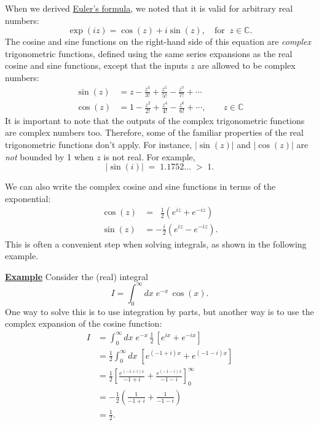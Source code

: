 \documentclass[10pt,a4paper]{article}
\begin{document}
When we derived \protect\hyperlink{euler_formula}{Euler's formula}, we
noted that it is valid for arbitrary real numbers:
\begin{equation}
  \exp(iz) = \cos(z) + i \sin(z), \quad \mathrm{for}\;\;z\in\mathbb{C}.
\end{equation}
The cosine and sine functions on the right-hand side of this equation
are \textit{complex} trigonometric functions, defined using the same
series expansions as the real cosine and sine functions, except that
the inputs $z$ are allowed to be complex numbers:
\begin{align}
  \sin(z) &= z - \frac{z^3}{3!} + \frac{z^5}{5!} - \frac{z^7}{7!} + \cdots \\
  \cos(z) &= 1 - \frac{z^2}{2!} + \frac{z^4}{4!} - \frac{z^6}{6!} + \cdots, 
  \quad\quad z\in \mathbb{C}
\end{align}
It is important to note that the outputs of the complex trigonometric
functions are complex numbers too. Therefore, some of the familiar
properties of the real trigonometric functions don't apply. For
instance, $|\sin(z)|$ and $|\cos(z)|$ are \emph{not} bounded by 1 when $z$
is not real. For example,
\begin{equation}
\Big|\sin(i)\Big| \;=\; 1.1752\dots \; >\; 1.
\end{equation}

We can also write the complex cosine and sine functions in terms of
the exponential:
\begin{align}
  \cos(z) &= \;\;\frac{1}{2}\left(e^{iz} + e^{-iz}\right) \\
  \sin(z) &= -\frac{i}{2}\left(e^{iz} - e^{-iz}\right).
\end{align}
This is often a convenient step when solving integrals, as shown in
the following example.

\begin{framed}
\noindent
\underline{\textbf{Example}}
\vskip 0.1in \noindent
Consider the (real) integral
\begin{equation}
I = \int_0^\infty dx \; e^{- x} \, \cos(x).
\end{equation}
One way to solve this is to use integration by parts, but another way
is to use the complex expansion of the cosine function:
\begin{align}I &= \int_0^\infty dx \; e^{- x} \,\frac{1}{2}\, \left[e^{ix} + e^{-ix}\right] \\ &= \frac{1}{2} \int_0^\infty dx \; \left[e^{(-1+i)x} + e^{(-1-i)x}\right] \\ &= \frac{1}{2} \left[ \frac{e^{(-1+i) x}}{-1+i} + \frac{e^{(-1 - i) x}}{-1 - i}\right]_0^\infty \\ &= -\frac{1}{2} \left(\frac{1}{-1+i} + \frac{1}{-1 - i}\right) \\ &= \frac{1}{2}.\end{align}
\end{framed}
\end{document}
